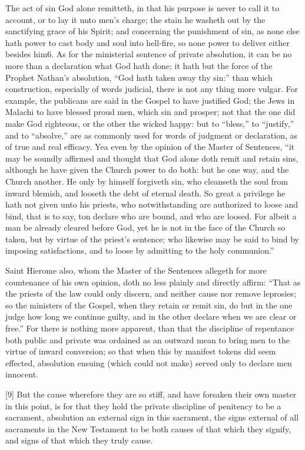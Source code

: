 The act of sin God alone remitteth, in that his purpose is never to call it to account, or to lay it unto men’s charge; the stain he washeth out by the sanctifying grace of his Spirit; and concerning the punishment of sin, as none else hath power to cast body and soul into hell-fire, so none power to deliver either besides him6. As for the ministerial sentence of private absolution, it can be no more than a declaration what God hath done; it hath but the force of the Prophet Nathan’s absolution, “God hath taken away thy sin:” than which construction, especially of words judicial, there is not any thing more vulgar. For example, the publicans are said in the Gospel to have justified God; the Jews in Malachi to have blessed proud men, which sin and prosper; not that the one did make God righteous, or the other the wicked happy: but to “bless,” to “justify,” and to “absolve,” are as commonly used for words of judgment or declaration, as of true and real efficacy. Yea even by the  opinion of the Master of Sentences, “it may be soundly affirmed and thought that God alone doth remit and retain sins, although he have given the Church power to do both: but he one way, and the Church another. He only by himself forgiveth sin, who cleanseth the soul from inward blemish, and looseth the debt of eternal death. So great a privilege he hath not given unto his priests, who notwithstanding are authorized to loose and bind, that is to say, ton declare who are bound, and who are loosed. For albeit a man be already cleared before God, yet he is not in the face of the Church so taken, but by virtue of the priest’s sentence; who likewise may be said to bind by imposing satisfactions, and to loose by admitting to the holy communion.”

Saint Hierome also, whom the Master of the Sentences allegeth for more countenance of his own opinion, doth no less plainly and directly affirm: “That as the priests of the law could only discern, and neither cause nor remove leprosies; so the ministers of the Gospel, when they retain or remit sin, do but in the one judge how long we continue guilty, and in the other declare when we are clear or free.” For there is nothing more apparent, than that the discipline  of repentance both public and private was ordained as an outward mean to bring men to the virtue of inward conversion; so that when this by manifest tokens did seem effected, absolution ensuing (which could not make) served only to declare men innocent.

[9] But the cause wherefore they are so stiff, and have forsaken their own master in this point, is for that they hold the private discipline of penitency to be a sacrament, absolution an external sign in this sacrament, the signs external of all sacraments in the New Testament to be both causes of that which they signify, and signs of that which they truly cause.

